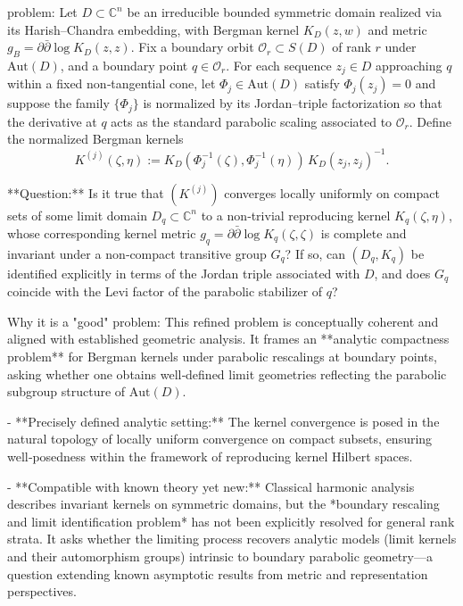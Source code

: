 problem:  
Let \( D \subset \mathbb{C}^n \) be an irreducible bounded symmetric domain realized via its Harish–Chandra embedding, with Bergman kernel \(K_D(z,w)\) and metric \( g_B = \partial\bar\partial \log K_D(z,z) \).  
Fix a boundary orbit \( \mathcal{O}_r \subset S(D) \) of rank \( r \) under \( \mathrm{Aut}(D) \), and a boundary point \( q \in \mathcal{O}_r \).  
For each sequence \(z_j \in D \) approaching \( q \) within a fixed non‑tangential cone, let \( \Phi_j \in \mathrm{Aut}(D) \) satisfy \(\Phi_j(z_j)=0\) and suppose the family \( \{ \Phi_j \} \) is normalized by its Jordan–triple factorization so that the derivative at \(q\) acts as the standard parabolic scaling associated to \( \mathcal{O}_r \).  
Define the normalized Bergman kernels
\[
K^{(j)}(\zeta,\eta)
:= K_D(\Phi_j^{-1}(\zeta),\Phi_j^{-1}(\eta))\,K_D(z_j,z_j)^{-1}.
\]

**Question:**  
Is it true that \( (K^{(j)}) \) converges locally uniformly on compact sets of some limit domain \( D_q \subset \mathbb{C}^n \) to a non‑trivial reproducing kernel \( K_q(\zeta,\eta) \), whose corresponding kernel metric \(g_q = \partial\bar\partial \log K_q(\zeta,\zeta)\) is complete and invariant under a non‑compact transitive group \(G_q\)?  
If so, can \( (D_q,K_q) \) be identified explicitly in terms of the Jordan triple associated with \( D \), and does \( G_q \) coincide with the Levi factor of the parabolic stabilizer of \( q \)?  

Why it is a "good" problem:  
This refined problem is conceptually coherent and aligned with established geometric analysis. It frames an **analytic compactness problem** for Bergman kernels under parabolic rescalings at boundary points, asking whether one obtains well‑defined limit geometries reflecting the parabolic subgroup structure of \( \mathrm{Aut}(D) \).

- **Precisely defined analytic setting:**  
   The kernel convergence is posed in the natural topology of locally uniform convergence on compact subsets, ensuring well‑posedness within the framework of reproducing kernel Hilbert spaces.

- **Compatible with known theory yet new:**  
   Classical harmonic analysis describes invariant kernels on symmetric domains, but the *boundary rescaling and limit identification problem* has not been explicitly resolved for general rank strata. It asks whether the limiting process recovers analytic models (limit kernels and their automorphism groups) intrinsic to boundary parabolic geometry—a question extending known asymptotic results from metric and representation perspectives.

